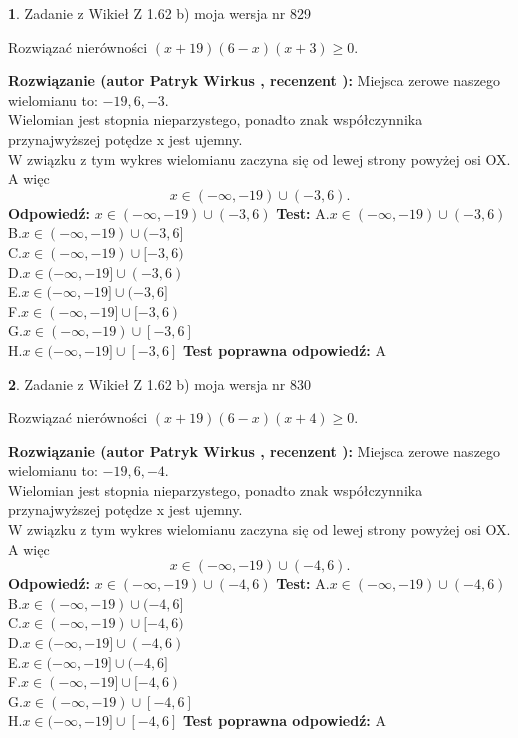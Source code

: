 \documentclass[12pt, a4paper]{article}
\theoremstyle{definition} %
\newtheorem{zad}{}
\newcommand{\zadStart}[1]{\begin{zad}#1\newline}
\newcommand{\zadStop}{\end{zad}}
\newcommand{\rozwStart}[2]{\noindent \textbf{Rozwiązanie (autor #1 , recenzent #2): }\newline}
\newcommand{\rozwStop}{\newline}
\newcommand{\odpStart}{\noindent \textbf{Odpowiedź:}\newline}
\newcommand{\odpStop}{\newline}
\newcommand{\testStart}{\noindent \textbf{Test:}\newline}
\newcommand{\testStop}{\newline}
\newcommand{\kluczStart}{\noindent \textbf{Test poprawna odpowiedź:}\newline}
\newcommand{\kluczStop}{\newline}
\begin{document}
\zadStart{Zadanie z Wikieł Z 1.62 b) moja wersja nr 829}

Rozwiązać nierówności $(x+19)(6-x)(x+3)\ge0$.
\zadStop
\rozwStart{Patryk Wirkus}{}
Miejsca zerowe naszego wielomianu to: $-19, 6, -3$.\\
Wielomian jest stopnia nieparzystego, ponadto znak współczynnika przy\linebreak najwyższej potędze x jest ujemny.\\ W związku z tym wykres wielomianu zaczyna się od lewej strony powyżej osi OX. A więc $$x \in (-\infty,-19) \cup (-3,6).$$
\rozwStop
\odpStart
$x \in (-\infty,-19) \cup (-3,6)$
\odpStop
\testStart
A.$x \in (-\infty,-19) \cup (-3,6)$\\
B.$x \in (-\infty,-19) \cup (-3,6]$\\
C.$x \in (-\infty,-19) \cup [-3,6)$\\
D.$x \in (-\infty,-19] \cup (-3,6)$\\
E.$x \in (-\infty,-19] \cup (-3,6]$\\
F.$x \in (-\infty,-19] \cup [-3,6)$\\
G.$x \in (-\infty,-19) \cup [-3,6]$\\
H.$x \in (-\infty,-19] \cup [-3,6]$
\testStop
\kluczStart
A
\kluczStop



\zadStart{Zadanie z Wikieł Z 1.62 b) moja wersja nr 830}

Rozwiązać nierówności $(x+19)(6-x)(x+4)\ge0$.
\zadStop
\rozwStart{Patryk Wirkus}{}
Miejsca zerowe naszego wielomianu to: $-19, 6, -4$.\\
Wielomian jest stopnia nieparzystego, ponadto znak współczynnika przy\linebreak najwyższej potędze x jest ujemny.\\ W związku z tym wykres wielomianu zaczyna się od lewej strony powyżej osi OX. A więc $$x \in (-\infty,-19) \cup (-4,6).$$
\rozwStop
\odpStart
$x \in (-\infty,-19) \cup (-4,6)$
\odpStop
\testStart
A.$x \in (-\infty,-19) \cup (-4,6)$\\
B.$x \in (-\infty,-19) \cup (-4,6]$\\
C.$x \in (-\infty,-19) \cup [-4,6)$\\
D.$x \in (-\infty,-19] \cup (-4,6)$\\
E.$x \in (-\infty,-19] \cup (-4,6]$\\
F.$x \in (-\infty,-19] \cup [-4,6)$\\
G.$x \in (-\infty,-19) \cup [-4,6]$\\
H.$x \in (-\infty,-19] \cup [-4,6]$
\testStop
\kluczStart
A
\kluczStop
\end{document}

